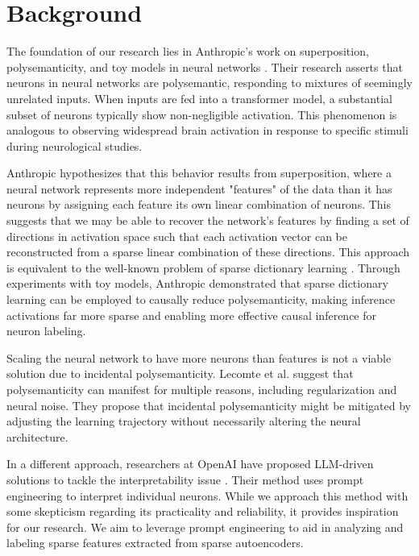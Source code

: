 \section{Background}

The foundation of our research lies in Anthropic's work on superposition, polysemanticity, and toy models in neural networks \cite{bricken2023monosemanticity, templeton2024scaling, elhage2021mathematical, elhage2022superposition}. Their research asserts that neurons in neural networks are polysemantic, responding to mixtures of seemingly unrelated inputs. When inputs are fed into a transformer model, a substantial subset of neurons typically show non-negligible activation. This phenomenon is analogous to observing widespread brain activation in response to specific stimuli during neurological studies.

Anthropic hypothesizes that this behavior results from superposition, where a neural network represents more independent "features" of the data than it has neurons by assigning each feature its own linear combination of neurons. This suggests that we may be able to recover the network's features by finding a set of directions in activation space such that each activation vector can be reconstructed from a sparse linear combination of these directions. This approach is equivalent to the well-known problem of sparse dictionary learning \cite{cunningham2023sparseautoencoders}. Through experiments with toy models, Anthropic demonstrated that sparse dictionary learning can be employed to causally reduce polysemanticity, making inference activations far more sparse and enabling more effective causal inference for neuron labeling.

Scaling the neural network to have more neurons than features is not a viable solution due to incidental polysemanticity. Lecomte et al. \cite{lecomte2024causespolysemanticity} suggest that polysemanticity can manifest for multiple reasons, including regularization and neural noise. They propose that incidental polysemanticity might be mitigated by adjusting the learning trajectory without necessarily altering the neural architecture.

In a different approach, researchers at OpenAI have proposed LLM-driven solutions to tackle the interpretability issue \cite{bills2023language}. Their method uses prompt engineering to interpret individual neurons. While we approach this method with some skepticism regarding its practicality and reliability, it provides inspiration for our research. We aim to leverage prompt engineering to aid in analyzing and labeling sparse features extracted from sparse autoencoders.

